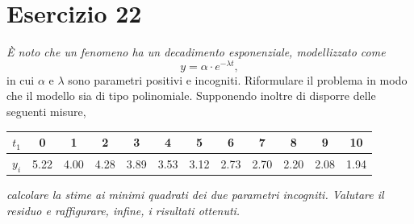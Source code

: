 \section{Esercizio 22}
\label{sub:Esercizio 22}
\emph{È noto che un fenomeno ha un decadimento esponenziale, modellizzato come}
			$$y=\alpha\cdot e^{-\lambda t},$$
			in cui $\alpha$ e $\lambda$ sono parametri positivi e incogniti. Riformulare il problema in modo che il modello sia di tipo polinomiale. Supponendo inoltre di disporre delle seguenti misure,
			\begin{center}
				\setlength{\tabcolsep}{4pt}
				\begin{tabular}{|c|c c c c c c c c c c c|}
					\hline
					$t_1$ & 0 & 1 & 2 & 3 & 4 & 5 & 6 & 7 & 8 & 9 & 10\\
					\hline
					$y_i$ & 5.22 & 4.00 & 4.28 & 3.89 & 3.53 & 3.12 & 2.73 & 2.70 & 2.20 & 2.08 & 1.94\\
					\hline
				\end{tabular}
			\end{center}
\emph{calcolare la stime ai minimi quadrati dei due parametri incogniti. Valutare il residuo e raffigurare, infine, i risultati ottenuti.}
